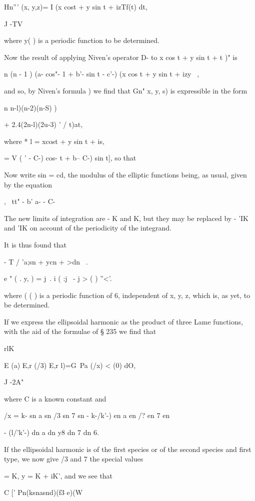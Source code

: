 {{{{{{{{Hn''' (x, y,z)= I (x cost + y sin t + izTf(t) dt,

J -TV

where y( ) is a periodic function to be determined.

Now the result of applying Niven's operator D- to x cos t + y sin t +
t )" is

n (n - 1 ) (a- cos"- 1 + b'- sin t - c'-) (x cos t + y sin t + izy ~,

and so, by Niven's formula ) we find that Gn" x, y, s) is
expressible in the form

n n-l)(n-2)(n-S) )

+ 2.4(2n-l)(2u-3) '  / t)at,

%
%

where * l = xcost + y sin t + is,

  = V ( ' - C-) cos- t + b-- C-) sin t], so that

Now write sin = cd, the modulus of the elliptic functions being, as
usual, given by the equation

, \ tt" - b' a- - C-

The new limits of integration are - K and K, but they may be replaced
by - 'IK and 'IK on account of the periodicity of the integrand.

It is thus found that

 - T / 'a;sn + ycn + >dn \ .

e " ( . y, ) = j\ . i ( :j \ - j > ( ) ''<'.

where ( ( ) is a periodic function of 6, independent of x, y, z, which
is, as yet, to be determined.

If we express the ellipsoidal harmonic as the product of three Lame
functions, with the aid of the formulae of § 235 we find that

rlK

E (a) E,r (/3) E,r l)=G\ Pa (/x) < (0) dO,

J -2A"

where C is a known constant and

/x = k- sn a sn /3 sn 7 sn - k-/k'-) en a en /? en 7 en

- (l/'k'-) dn a dn y8 dn 7 dn 6.

If the ellipsoidal harmonic is of the first species or of the second
species and first type, we now give /3 and 7 the special values

  = K, y = K + iK', and we see that

C [' Pn(ksnasnd)(f3 e)(W

}}}}}}}}

